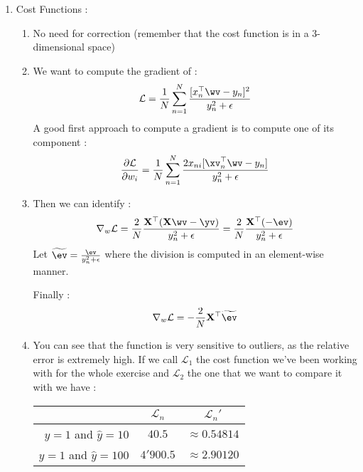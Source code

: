 \documentclass{../../tex_import/ETHuebung_english}
\begin{document}
\begin{enumerate}
	\item Cost Functions :
		\begin{enumerate}
			\item No need for correction (remember that the cost function is in a 3-dimensional space)
			\item We want to compute the gradient of :
				\begin{equation*}
					\mathcal{L} = \frac{1}{N} \sum_{n=1}^{N}{\frac{[x_n^\top\wv - y_n]^2}{y_n^2 +\epsilon}}
				\end{equation*}
				A good first approach to compute a gradient is to compute one of its component :
				\begin{equation*}
					\frac{\partial\mathcal{L}}{\partial w_i} = \frac{1}{N} \sum_{n=1}^{N}{\frac{2 x_{ni} [\xv_n^\top\wv - y_n]}{y_n^2 +\epsilon}}
				\end{equation*}
				
			\item Then we can identify :
				\begin{equation}
					\nabla_w\mathcal{L} = \frac{2}{N}\frac{\mathbf{X}^\top (\mathbf{X}\wv-\yv)}{y_n^2 +\epsilon} = \frac{2}{N}\frac{\mathbf{X}^\top (-\ev)}{y_n^2 +\epsilon} 
				\end{equation}
				Let $\widetilde\ev = \frac{\ev}{y_n^2 +\epsilon}$ where the division is computed in an element-wise manner. 
				
				Finally :
				\begin{equation}
					\nabla_w\mathcal{L} = -\frac{2}{N}\mathbf{X}^\top \widetilde\ev				
				\end{equation}
				
			\item You can see that the function is very sensitive to outliers, as the relative error is extremely high. If we call $\mathcal{L}_1$ the cost function we've been working with for the whole exercise and $\mathcal{L}_2$ the one that we want to compare it with we have :
			
				\begin{center}
					\begin{tabular}{r|cc}
					          & $\mathcal{L}_n$ & $\mathcal{L}_n'$ 	\\
						\hline
						$y=1$ and $\hat{y}=10$  &   $40.5$ &  $\approx 0.54814	$\\
						$y=1$ and $\hat{y}=100$ &   $4'900.5$ & $\approx 2.90120$\\
					\end{tabular}
				\end{center}
				
		\end{enumerate}
	
	
\end{enumerate}
\end{document}
